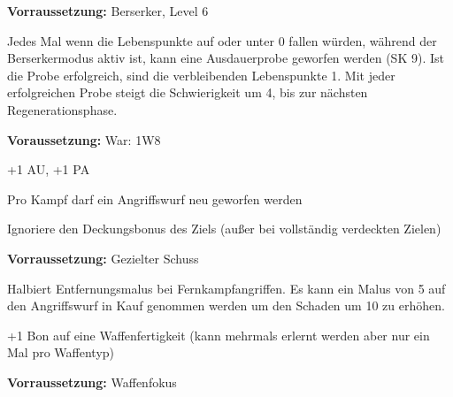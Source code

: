 \documentclass[../../Heldenanleitung2]{subfiles}
\begin{document}
\begin{multicols}{2}
\begin{tcolorbox}[title={Berserkerkraft, Unbezwingbar},colbacktitle=red, coltitle=black]    
    \textbf{Vorraussetzung:} Berserker, Level 6
	\vspace{0.2cm}	
	
    Jedes Mal wenn die Lebenspunkte auf oder unter 0 fallen würden, während der Berserkermodus aktiv ist, kann eine Ausdauerprobe geworfen werden (SK 9). Ist die Probe erfolgreich, sind die verbleibenden Lebenspunkte 1. Mit jeder erfolgreichen Probe steigt die Schwierigkeit um 4, bis zur nächsten Regenerationsphase.
\end{tcolorbox}

\begin{tcolorbox}[title={Schnelle Reflexe},colbacktitle=red, coltitle=black]
	\textbf{Voraussetzung:} War: 1W8
	\vspace{0.2cm}
	
   +1 AU, +1 PA
\end{tcolorbox}

\begin{tcolorbox}[title={Kampferfahrung},colbacktitle=red, coltitle=black]    
   Pro Kampf darf ein Angriffswurf neu geworfen werden
\end{tcolorbox}

\begin{tcolorbox}[title={Gezielter Schuss},colbacktitle=red, coltitle=black]    
   Ignoriere den Deckungsbonus des Ziels (außer bei vollständig verdeckten Zielen)
\end{tcolorbox}

\begin{tcolorbox}[title={Scharfschütze},colbacktitle=red, coltitle=black]
	\textbf{Vorraussetzung:} Gezielter Schuss
	\vspace{0.2cm}
	
   Halbiert Entfernungsmalus bei Fernkampfangriffen. Es kann ein Malus von 5 auf den Angriffswurf in Kauf genommen werden um den Schaden um 10 zu erhöhen.
\end{tcolorbox}

\begin{tcolorbox}[title={Waffenfokus},colbacktitle=red, coltitle=black]    
   +1 Bon auf eine Waffenfertigkeit (kann mehrmals erlernt werden aber nur ein Mal pro Waffentyp)
\end{tcolorbox}

\begin{tcolorbox}[title={Waffenspezialisierung},colbacktitle=red, coltitle=black]  
	\textbf{Vorraussetzung:} Waffenfokus
	\vspace{0.2cm}
	  

\end{tcolorbox}
\end{multicols}
\end{document}
